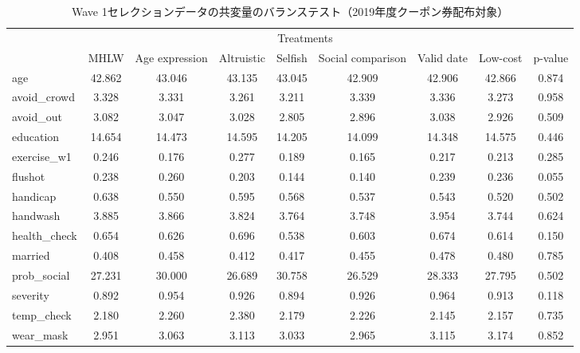 \documentclass[
  11pt,
  a4paper,
]{article}
\begin{document}
\begin{table}

\caption{\label{tab:show-int-coupon1-balance}Wave 1セレクションデータの共変量のバランステスト（2019年度クーポン券配布対象）}
\centering
\begin{tabular}[t]{lcccccccc}
\toprule
\multicolumn{1}{c}{ } & \multicolumn{7}{c}{Treatments} & \multicolumn{1}{c}{ } \\
\cmidrule(l{3pt}r{3pt}){2-8}
  & MHLW & Age expression & Altruistic & Selfish & Social comparison & Valid date & Low-cost & p-value\\
\midrule
age & 42.862 & 43.046 & 43.135 & 43.045 & 42.909 & 42.906 & 42.866 & 0.874\\
avoid\_crowd & 3.328 & 3.331 & 3.261 & 3.211 & 3.339 & 3.336 & 3.273 & 0.958\\
avoid\_out & 3.082 & 3.047 & 3.028 & 2.805 & 2.896 & 3.038 & 2.926 & 0.509\\
education & 14.654 & 14.473 & 14.595 & 14.205 & 14.099 & 14.348 & 14.575 & 0.446\\
exercise\_w1 & 0.246 & 0.176 & 0.277 & 0.189 & 0.165 & 0.217 & 0.213 & 0.285\\
flushot & 0.238 & 0.260 & 0.203 & 0.144 & 0.140 & 0.239 & 0.236 & 0.055\\
handicap & 0.638 & 0.550 & 0.595 & 0.568 & 0.537 & 0.543 & 0.520 & 0.502\\
handwash & 3.885 & 3.866 & 3.824 & 3.764 & 3.748 & 3.954 & 3.744 & 0.624\\
health\_check & 0.654 & 0.626 & 0.696 & 0.538 & 0.603 & 0.674 & 0.614 & 0.150\\
married & 0.408 & 0.458 & 0.412 & 0.417 & 0.455 & 0.478 & 0.480 & 0.785\\
prob\_social & 27.231 & 30.000 & 26.689 & 30.758 & 26.529 & 28.333 & 27.795 & 0.502\\
severity & 0.892 & 0.954 & 0.926 & 0.894 & 0.926 & 0.964 & 0.913 & 0.118\\
temp\_check & 2.180 & 2.260 & 2.380 & 2.179 & 2.226 & 2.145 & 2.157 & 0.735\\
wear\_mask & 2.951 & 3.063 & 3.113 & 3.033 & 2.965 & 3.115 & 3.174 & 0.852\\
\bottomrule
\end{tabular}
\end{table}
\end{document}
